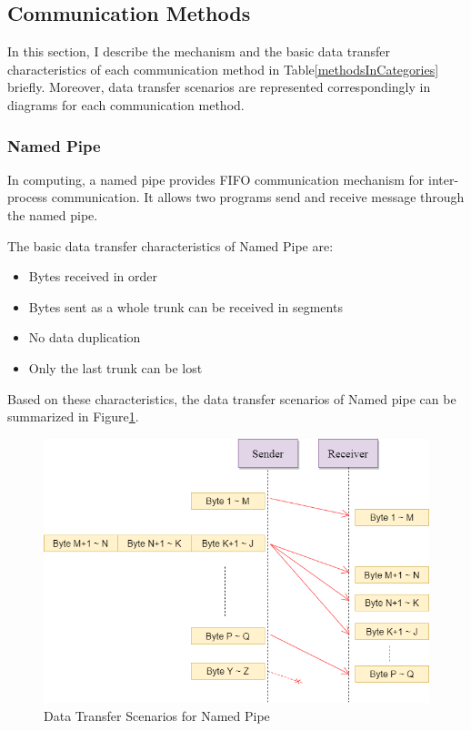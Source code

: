 \subsection{Communication Methods}
In this section, I describe the mechanism and the basic data transfer characteristics of each communication method in Table\ref{methodsInCategories} briefly. Moreover, data transfer scenarios are represented correspondingly in diagrams for each communication method. 
 
\subsubsection{Named Pipe}
In computing, a named pipe provides FIFO communication mechanism for inter-process communication. It allows two programs send and receive message through the named pipe.

The basic data transfer characteristics of Named Pipe are:
\begin{itemize}
  \item Bytes received in order
  \item Bytes sent as a whole trunk can be received in segments
  \item No data duplication
  \item Only the last trunk can be lost
\end{itemize}

Based on these characteristics, the data transfer scenarios of Named pipe can be summarized in Figure\ref{namedpipe}. 
\begin{figure}[H]
\centerline{\includegraphics[scale=0.48]{Figures/namedpipe}}
\caption{Data Transfer Scenarios for Named Pipe}
\label{namedpipe}
\end{figure}

